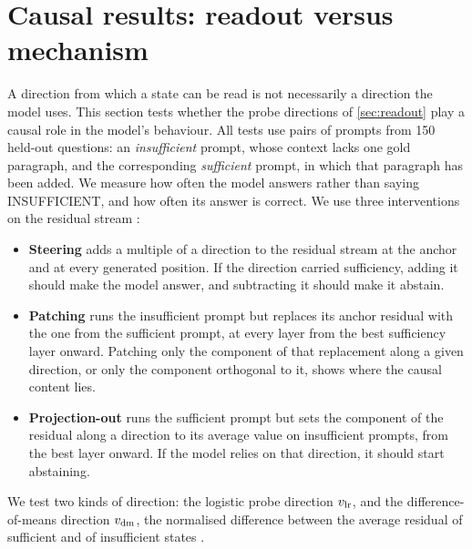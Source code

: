 \section{Causal results: readout versus mechanism}
\label{sec:causal}

A direction from which a state can be read is not necessarily a direction the model uses. This section tests whether the probe directions of \cref{sec:readout} play a causal role in the model's behaviour. All tests use pairs of prompts from 150 held-out questions: an \emph{insufficient} prompt, whose context lacks one gold paragraph, and the corresponding \emph{sufficient} prompt, in which that paragraph has been added. We measure how often the model answers rather than saying INSUFFICIENT, and how often its answer is correct. We use three interventions on the residual stream \cite{ActivationSteering,meng2022locating}:
\begin{itemize}
  \item \textbf{Steering} adds a multiple of a direction to the residual stream at the anchor and at every generated position. If the direction carried sufficiency, adding it should make the model answer, and subtracting it should make it abstain.
  \item \textbf{Patching} runs the insufficient prompt but replaces its anchor residual with the one from the sufficient prompt, at every layer from the best sufficiency layer onward. Patching only the component of that replacement along a given direction, or only the component orthogonal to it, shows where the causal content lies.
  \item \textbf{Projection-out} runs the sufficient prompt but sets the component of the residual along a direction to its average value on insufficient prompts, from the best layer onward. If the model relies on that direction, it should start abstaining.
\end{itemize}
We test two kinds of direction: the logistic probe direction $\vlr$, and the difference-of-means direction $\vdm$, the normalised difference between the average residual of sufficient and of insufficient states \cite{marks2023geometry}.

\begin{table}[t]
\centering\scriptsize
\setlength{\tabcolsep}{3pt}

\caption{Causal tests on 150 held-out questions, intervening at every layer from the best sufficiency layer onward. Left: the insufficient prompt with its anchor residual patched from the sufficient prompt (correct / answered rate). ``none'': no patch; ``full'': the whole residual; $\parallel v$ and $\perp v$: only the component along, or orthogonal to, the probe direction; ``rand-256'': a random 256-dimensional subspace; PC1, PC256: the top 1 or 256 principal components of training updates; ``unemb.'': the gold answer's unembedding direction. Right: the sufficient prompt with the component along a direction set to its insufficient-state value (answered rate). $\vdm$: difference-of-means direction; $\vlr$: logistic-probe direction.}
\label{tab:causal}
\end{table}

